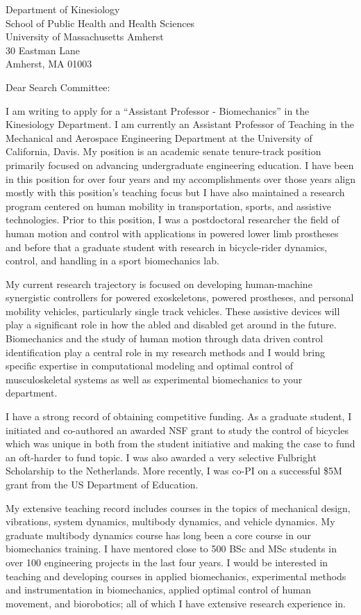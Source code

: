 \documentclass{letter}
\date{}
\begin{document}
\begin{letter}{
  Department of Kinesiology \\
  School of Public Health and Health Sciences \\
  University of Massachusetts Amherst \\
  30 Eastman Lane \\
  Amherst, MA 01003
}

\opening{Dear Search Committee:}

I am writing to apply for a ``Assistant Professor - Biomechanics'' in the
Kinesiology Department. I am currently an Assistant Professor of Teaching in
the Mechanical and Aerospace Engineering Department at the University of
California, Davis. My position is an academic senate tenure-track position
primarily focused on advancing undergraduate engineering education. I have been
in this position for over four years and my accomplishments over those years
align mostly with this position's teaching focus but I have also maintained a
research program centered on human mobility in transportation, sports, and
assistive technologies. Prior to this position, I was a postdoctoral researcher
the field of human motion and control with applications in powered lower limb
prostheses and before that a graduate student with research in bicycle-rider
dynamics, control, and handling in a sport biomechanics lab.

My current research trajectory is focused on developing human-machine
synergistic controllers for powered exoskeletons, powered prostheses, and
personal mobility vehicles, particularly single track vehicles. These assistive
devices will play a significant role in how the abled and disabled get around
in the future. Biomechanics and the study of human motion through data driven
control identification play a central role in my research methods and I would
bring specific expertise in computational modeling and optimal control of
musculoskeletal systems as well as experimental biomechanics to your
department.

I have a strong record of obtaining competitive funding. As a graduate student,
I initiated and co-authored an awarded NSF grant to study the control of
bicycles which was unique in both from the student initiative and making the
case to fund an oft-harder to fund topic. I was also awarded a very selective
Fulbright Scholarship to the Netherlands. More recently, I was co-PI on a
successful \$5M grant from the US Department of Education.

My extensive teaching record includes courses in the topics of mechanical
design, vibrations, system dynamics, multibody dynamics, and vehicle dynamics.
My graduate multibody dynamics course has long been a core course in our
biomechanics training. I have mentored close to 500 BSc and MSc students in
over 100 engineering projects in the last four years. I would be interested in
teaching and developing courses in applied biomechanics, experimental methods
and instrumentation in biomechanics, applied optimal control of human movement,
and biorobotics; all of which I have extensive research experience in.


\end{letter}
\end{document}
